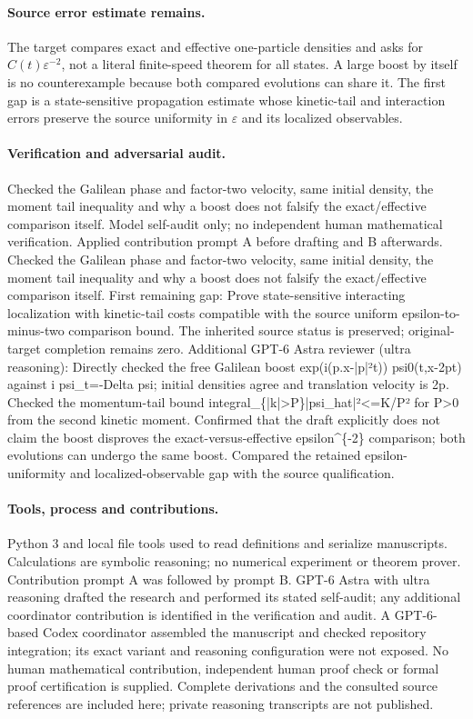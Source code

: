 \documentclass[11pt]{article}
\begin{document}
\paragraph{Source error estimate remains.} The target compares exact and effective one-particle densities and asks for \(C(t)\varepsilon^{-2}\), not a literal finite-speed theorem for all states. A large boost by itself is no counterexample because both compared evolutions can share it. The first gap is a state-sensitive propagation estimate whose kinetic-tail and interaction errors preserve the source uniformity in \(\varepsilon\) and its localized observables.

\paragraph{Verification and adversarial audit.}
Checked the Galilean phase and factor-two velocity, same initial density, the moment tail inequality and why a boost does not falsify the exact/effective comparison itself. Model self-audit only; no independent human mathematical verification. Applied contribution prompt A before drafting and B afterwards. Checked the Galilean phase and factor-two velocity, same initial density, the moment tail inequality and why a boost does not falsify the exact/effective comparison itself. First remaining gap: Prove state-sensitive interacting localization with kinetic-tail costs compatible with the source uniform epsilon-to-minus-two comparison bound. The inherited source status is preserved; original-target completion remains zero. Additional GPT-6 Astra reviewer (ultra reasoning): Directly checked the free Galilean boost exp(i(p.x-|p|²t)) psi0(t,x-2pt) against i psi\_t=-Delta psi; initial densities agree and translation velocity is 2p. Checked the momentum-tail bound integral\_\{|k|>P\}|psi\_hat|²<=K/P² for P>0 from the second kinetic moment. Confirmed that the draft explicitly does not claim the boost disproves the exact-versus-effective epsilon\textasciicircum{}\{-2\} comparison; both evolutions can undergo the same boost. Compared the retained epsilon-uniformity and localized-observable gap with the source qualification.

\paragraph{Tools, process and contributions.}
Python 3 and local file tools used to read definitions and serialize manuscripts. Calculations are symbolic reasoning; no numerical experiment or theorem prover. Contribution prompt A was followed by prompt B. GPT-6 Astra with ultra reasoning drafted the research and performed its stated self-audit; any additional coordinator contribution is identified in the verification and audit. A GPT-6-based Codex coordinator assembled the manuscript and checked repository integration; its exact variant and reasoning configuration were not exposed. No human mathematical contribution, independent human proof check or formal proof certification is supplied. Complete derivations and the consulted source references are included here; private reasoning transcripts are not published.
\end{document}
